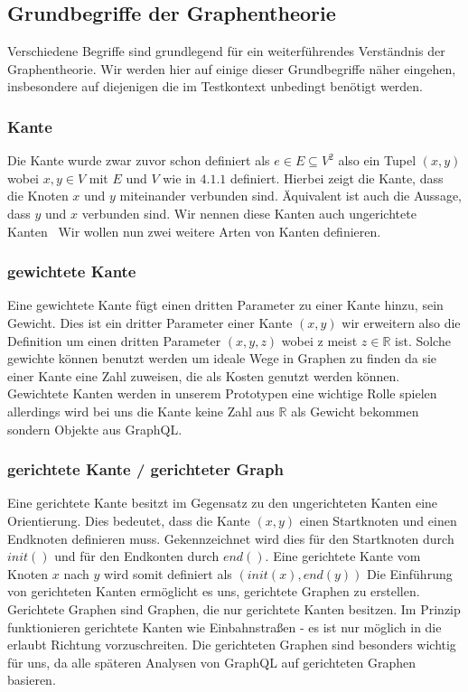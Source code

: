 \subsection{Grundbegriffe der Graphentheorie}

Verschiedene Begriffe sind grundlegend für ein weiterführendes Verständnis der Graphentheorie.
Wir werden hier auf einige dieser Grundbegriffe näher eingehen, insbesondere auf diejenigen die im Testkontext unbedingt benötigt werden.

\subsubsection{Kante}
Die Kante wurde zwar zuvor schon definiert als $e \in E \subseteq V^2$ also ein Tupel $(x, y)$ wobei $x,y \in V$ mit $E$ und $V$ wie in $4.1.1$ definiert.
Hierbei zeigt die Kante, dass die Knoten $x$ und $y$ miteinander verbunden sind.
Äquivalent ist auch die Aussage, dass $y$ und $x$ verbunden sind.
Wir nennen diese Kanten auch ungerichtete Kanten~\cite[vgl. S.3 0.1 Graphen]{graphentheorie}
Wir wollen nun zwei weitere Arten von Kanten definieren.

\subsubsection{gewichtete Kante}

Eine gewichtete Kante fügt einen dritten Parameter zu einer Kante hinzu, sein Gewicht.
Dies ist ein dritter Parameter einer Kante $(x,y)$ wir erweitern also die Definition um einen dritten Parameter
$(x,y,z)$ wobei z meist $z \in \mathbb{R}$ ist.
Solche gewichte können benutzt werden um ideale Wege in Graphen zu finden da sie einer Kante eine Zahl zuweisen, die
als Kosten genutzt werden können.
Gewichtete Kanten werden in unserem Prototypen eine wichtige Rolle spielen allerdings wird bei uns die Kante
keine Zahl aus $\mathbb{R}$ als Gewicht bekommen sondern Objekte aus GraphQL\@.

\subsubsection{gerichtete Kante / gerichteter Graph}

Eine gerichtete Kante besitzt im Gegensatz zu den ungerichteten Kanten eine Orientierung.
Dies bedeutet, dass die Kante $(x,y)$ einen Startknoten und einen Endknoten definieren muss.
Gekennzeichnet wird dies für den Startknoten durch $init()$ und für den Endkonten durch $end()$.
Eine gerichtete Kante vom Knoten $x$ nach $y$ wird somit definiert als $(init(x), end(y))$ \cite[vgl. S.26 Verwandte Begriffsbildungen]{graphentheorie}
Die Einführung von gerichteten Kanten ermöglicht es uns, gerichtete Graphen zu erstellen.
Gerichtete Graphen sind Graphen, die nur gerichtete Kanten besitzen.
Im Prinzip funktionieren gerichtete Kanten wie Einbahnstraßen - es ist nur möglich in die erlaubt Richtung vorzuschreiten.
Die gerichteten Graphen sind besonders wichtig für uns, da alle späteren Analysen von GraphQL auf gerichteten Graphen
basieren.

